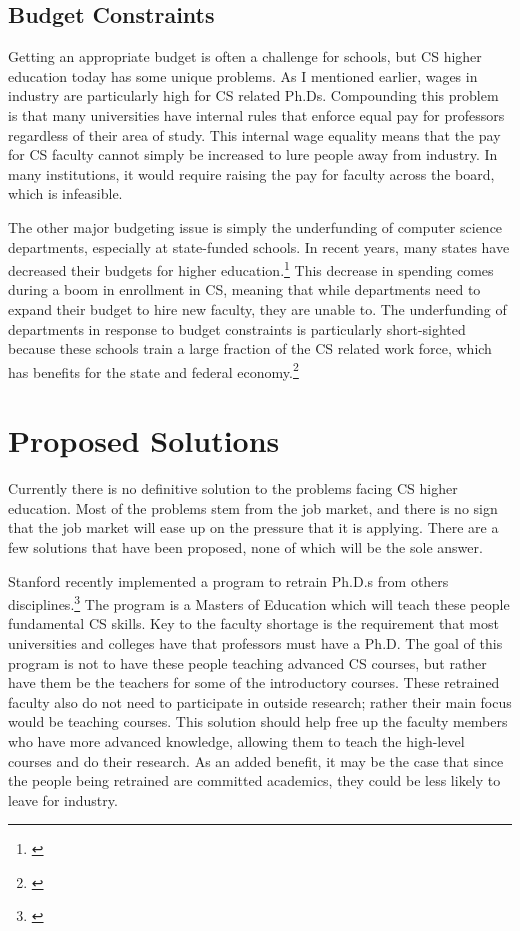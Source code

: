 \documentclass[12pt,twoside]{reedthesis}
\begin{document}
\subsection{Budget Constraints}
Getting an appropriate budget is often a challenge for schools, but CS higher education today has some unique problems. As I mentioned earlier, wages in industry are particularly high for CS related Ph.Ds. Compounding this problem is that many universities have internal rules that enforce equal pay for professors regardless of their area of study. This internal wage equality means that the pay for CS faculty cannot simply be increased to lure people away from industry. In many institutions, it would require raising the pay for faculty across the board, which is infeasible. 

The other major budgeting issue is simply the underfunding of computer science departments, especially at state-funded schools. In recent years, many states have decreased their budgets for higher education.\footnote{\cite{committee_on_the_growth_of_computer_science_undergraduate_enrollments_assessing_2018}}  This decrease in spending comes during a boom in enrollment in CS, meaning that while departments need to expand their budget to hire new faculty, they are unable to. The underfunding of departments in response to budget constraints is particularly short-sighted because these schools train a large fraction of the CS related work force, which has benefits for the state and federal economy.\footnote{\cite{committee_on_the_growth_of_computer_science_undergraduate_enrollments_assessing_2018}} 

\section{Proposed Solutions}

Currently there is no definitive solution to the problems facing CS higher education. Most of the problems stem from the job market, and there is no sign that the job market will ease up on the pressure that it is applying. There are a few solutions that have been proposed, none of which will be the sole answer.

Stanford recently implemented a program to retrain Ph.D.s from others disciplines.\footnote{\cite{starkman_stanford_0400}} The program is a Masters of Education which will teach these people fundamental CS skills. Key to the faculty shortage is the requirement that most universities and colleges have that professors must have a Ph.D. The goal of this program is not to have these people teaching advanced CS courses, but rather have them be the teachers for some of the introductory courses. These retrained faculty also do not need to participate in outside research; rather their main focus would be teaching courses. This solution should help free up the faculty members who have more advanced knowledge, allowing them to teach the high-level courses and do their research. As an added benefit, it may be the case that since the people being retrained are committed academics, they could be less likely to leave for industry. 
\end{document}
